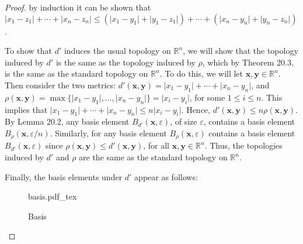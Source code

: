 \documentclass[12pt]{article}
\newcommand{\incfig}[1]{%
    \def\svgwidth{\columnwidth}
    {#1.pdf_tex}
}
\theoremstyle{definition}
\newcommand{\abs}[1]{\lvert #1 \rvert}
\begin{document}
\begin{enumerate}
\begin{enumerate}[label = (\alph*)]
\begin{proof}
                      by induction it can be shown that
                      $\abs{x_1-z_1}+\cdots+\abs{x_n-z_n}\leq(\abs{x_1-y_1}+\abs{y_1-z_1})
                      +\cdots+(\abs{x_n-y_n}+\abs{y_n-z_n})$.\par\hspace{4mm}
                      To show that $d'$ induces the usual topology on
                      $\mathbb{R}^n$, we will show that the topology induced by
                      $d'$ is the same as the topology induced by $\rho$, which
                      by Theorem 20.3, is the same as the standard topology on
                      $\mathbb{R}^n$. To do this, we will let $\mathbf{x},
                      \mathbf{y}\in \mathbb{R}^n$. Then consider the two
                      metrics: $d'(\mathbf{x},
                      \mathbf{y})=\abs{x_1-y_1}+\cdots+\abs{x_n-y_n}$, and
                      $\rho(\mathbf{x}, \mathbf{y})=\max\{\abs{x_1-y_1},
                      \dots, \abs{x_n-y_n}\}=\abs{x_i-y_i}$, for some $1\leq
                      i\leq n$. This implies that
                      $\abs{x_1-y_1}+\cdots+\abs{x_n-y_n}\leq n\abs{x_i-y_i}$.
                      Hence, $d'(\mathbf{x}, \mathbf{y})\leq n\rho(\mathbf{x},
                      \mathbf{y})$. By Lemma 20.2, any basis element
                      $B_{d'}(\mathbf{x}, \varepsilon)$, of size $\varepsilon$,
                      contains a basis element $B_{\rho}(\mathbf{x},
                      \varepsilon/n)$. Similarly, for any basis element
                     $B_{\rho}(\mathbf{x}, \varepsilon)$ contains a basis
                     element $B_{d'}(\mathbf{x}, \varepsilon)$ since
                     $\rho(\mathbf{x}, \mathbf{y})\leq d'(\mathbf{x},
                     \mathbf{y})$, for all $\mathbf{x}, \mathbf{y}\in
                     \mathbb{R}^n$. Thus, the topologies induced by $d'$ and
                     $\rho$ are the same as the standard topology on
                     $\mathbb{R}^n$.\par\hspace{4mm} Finally, the basis
                     elements under $d'$ appear as follows:
                     \begin{figure}[htp!]
                        \centering
                        \incfig{basis}
                        \caption{Basis}
                        \label{fig:basis}
                     \end{figure}\hfill\par\newpage
                  \end{proof}

\end{enumerate}
\end{enumerate}
\end{document}
